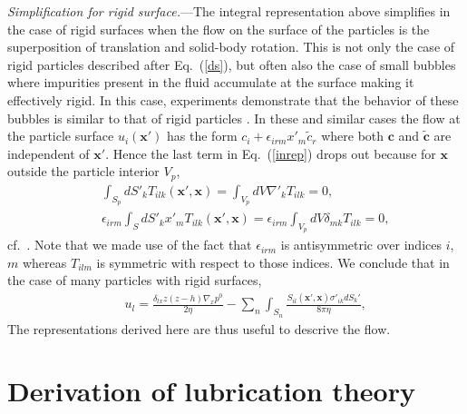
{\it Simplification for rigid surface.}---The integral representation above simplifies in the case of rigid surfaces when the flow on the surface of the particles is the superposition of translation and solid-body rotation. This is not only the case of rigid particles described after Eq.~(\ref{ds}), but  often also the case of small bubbles where impurities present in the fluid accumulate at the surface making it effectively rigid. In this case, experiments demonstrate that the behavior of these bubbles is similar to that of rigid particles \citep{hb,levich}. In these and similar cases the flow at the particle surface $u_i(\bm x')$ has the form  $c_i+\epsilon_{irm}x'_m{\tilde c}_r$ where both $\bm c$ and $\bm {\tilde c}$ are independent of $\bm x'$. Hence the last term in Eq.~(\ref{inrep}) drops out because  for $\bm x$ outside the particle interior $V_p$,
\begin{eqnarray}&&
\int_{S_p}dS'_k T_{ilk}(\bm x', \bm x)=\int_{V_p} dV \nabla'_k T_{ilk}=0, \\&& \epsilon_{irm}\int_{S}dS'_k x'_mT_{ilk}(\bm x', \bm x)
=\epsilon_{irm}\int_{V_p} dV \delta_{mk}T_{ilk}=0,
\nonumber
\end{eqnarray}
cf.\ \cite{ps}. Note that we made use of the fact that $\epsilon_{irm}$ is antisymmetric over indices $i$, $m$ whereas $T_{ilm}$ is symmetric with respect to those indices. We conclude that in the case of many particles with rigid surfaces,
\begin{eqnarray}&&\!\!\!\!\!\!\!\!\!\!\!\!\!\!\!\!
u_l\!=\!\frac{\delta_{lx}z(z\!-\!h)\nabla_x p^0}{2\eta}\!-\!\sum_n\int_{S_n}\!\!\!\frac{S_{il}(\bm x', \bm x)\sigma'_{ik}dS_k'}{8\pi \eta},\label{inrepmany}
\end{eqnarray}
The representations derived here are thus useful to descrive  the  flow.

\section{Derivation of lubrication theory}

